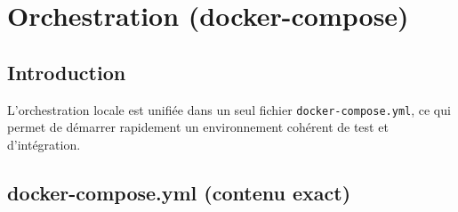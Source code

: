 \documentclass[12pt,a4paper]{report}
\begin{document}
\chapter{Orchestration (docker-compose)}

\section{Introduction}
L'orchestration locale est unifiée dans un seul fichier \texttt{docker-compose.yml},
ce qui permet de démarrer rapidement un environnement cohérent de test et d'intégration.

\section{docker-compose.yml (contenu exact)}
\end{document}
